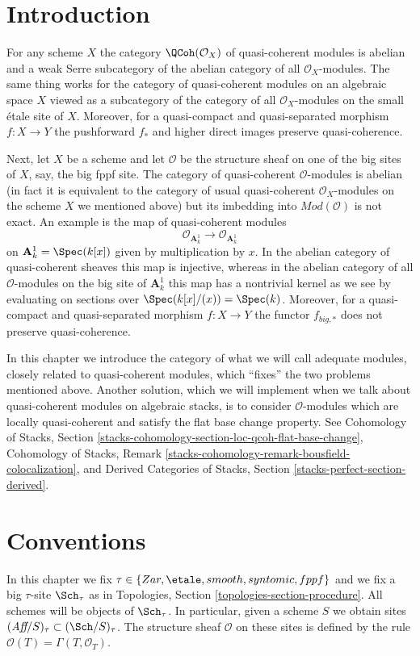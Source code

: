 \section{Introduction}
\label{adequate-section-introduction}
For any scheme $X$ the category $\QCoh(\mathcal{O}_X)$
of quasi-coherent modules is abelian and a weak Serre subcategory
of the abelian category of all $\mathcal{O}_X$-modules. The same
thing works for the category of quasi-coherent modules on
an algebraic space $X$ viewed as a subcategory of the category
of all $\mathcal{O}_X$-modules on the small \'etale site of $X$.
Moreover, for a quasi-compact and quasi-separated morphism
$f : X \to Y$ the pushforward $f_*$ and higher direct images
preserve quasi-coherence.

\medskip\noindent
Next, let $X$ be a scheme and let $\mathcal{O}$ be the structure
sheaf on one of the big sites of $X$, say, the big fppf site.
The category of quasi-coherent $\mathcal{O}$-modules is abelian
(in fact it is equivalent to the category of usual quasi-coherent
$\mathcal{O}_X$-modules on the scheme $X$ we mentioned above)
but its imbedding into $\textit{Mod}(\mathcal{O})$ is not exact.
An example is the map of quasi-coherent modules
$$
\mathcal{O}_{\mathbf{A}^1_k}
\longrightarrow
\mathcal{O}_{\mathbf{A}^1_k}
$$
on $\mathbf{A}^1_k = \Spec(k[x])$ given by multiplication by $x$.
In the abelian category of quasi-coherent sheaves this map is injective,
whereas in the abelian category of all $\mathcal{O}$-modules on the
big site of $\mathbf{A}^1_k$ this map has a nontrivial kernel as we
see by evaluating on sections over $\Spec(k[x]/(x)) = \Spec(k)$.
Moreover, for a quasi-compact and quasi-separated morphism
$f : X \to Y$ the functor $f_{big, *}$ does not preserve quasi-coherence.

\medskip\noindent
In this chapter we introduce the category of what we will call
adequate modules, closely related to quasi-coherent modules, which
``fixes'' the two problems mentioned above. Another solution,
which we will implement when we talk about quasi-coherent modules
on algebraic stacks, is to consider $\mathcal{O}$-modules which
are locally quasi-coherent and satisfy the flat base change property.
See Cohomology of Stacks, Section
\ref{stacks-cohomology-section-loc-qcoh-flat-base-change},
Cohomology of Stacks, Remark
\ref{stacks-cohomology-remark-bousfield-colocalization}, and
Derived Categories of Stacks, Section
\ref{stacks-perfect-section-derived}.

\section{Conventions}
\label{adequate-section-conventions}
In this chapter we fix
$\tau \in \{Zar, \etale, smooth, syntomic, fppf\}$
and we fix a big $\tau$-site $\Sch_\tau$ as in
Topologies, Section \ref{topologies-section-procedure}.
All schemes will be objects of $\Sch_\tau$.
In particular, given a scheme $S$ we obtain sites
$(\textit{Aff}/S)_\tau \subset (\Sch/S)_\tau$.
The structure sheaf $\mathcal{O}$ on these sites is defined by
the rule $\mathcal{O}(T) = \Gamma(T, \mathcal{O}_T)$.


